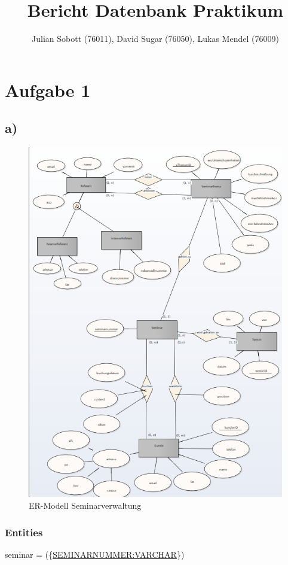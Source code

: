 \documentclass[10pt,a4paper]{report}
\author{Julian Sobott (76011), David Sugar (76050), Lukas Mendel (76009)}
\title{Bericht Datenbank Praktikum}
\begin{document}
\maketitle
\tableofcontents

\newpage
\section{Aufgabe 1}
\subsection{a)}
\begin{figure}[h]
	\includegraphics[scale=0.7]{Bilder/ER-Modell.PNG}
	\caption{ER-Modell Seminarverwaltung}
	\label{er:1}
\end{figure}

\subsubsection{Entities}
seminar = (\{\underline{SEMINARNUMMER:VARCHAR}\})
\end{document}
